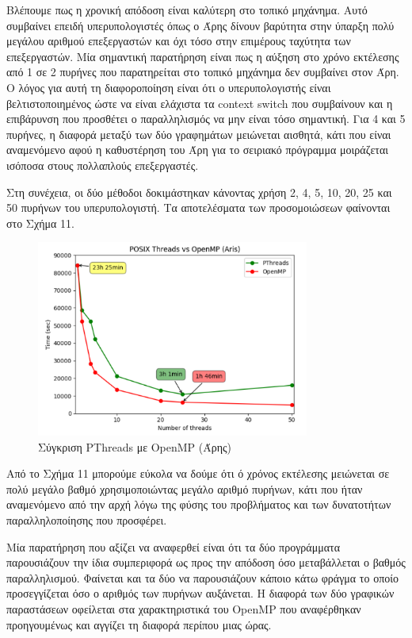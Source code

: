 \documentclass[12pt,a4paper]{article}
\begin{document}
Βλέπουμε πως η χρονική απόδοση είναι καλύτερη στο τοπικό μηχάνημα. Αυτό συμβαίνει επειδή υπερυπολογιστές όπως ο Άρης δίνουν βαρύτητα στην ύπαρξη πολύ μεγάλου αριθμού επεξεργαστών και όχι τόσο στην επιμέρους ταχύτητα των επεξεργαστών. Μία σημαντική παρατήρηση είναι πως η αύξηση στο χρόνο εκτέλεσης από 1 σε 2 πυρήνες που παρατηρείται στο τοπικό μηχάνημα δεν συμβαίνει στον Άρη. Ο λόγος για αυτή τη διαφοροποίηση είναι ότι ο υπερυπολογιστής είναι βελτιστοποιημένος ώστε να είναι ελάχιστα τα context switch που συμβαίνουν και η επιβάρυνση που προσθέτει ο παραλληλισμός να μην είναι τόσο σημαντική. Για 4 και 5 πυρήνες, η διαφορά μεταξύ των δύο γραφημάτων μειώνεται αισθητά, κάτι που είναι αναμενόμενο αφού η καθυστέρηση του Άρη για το σειριακό πρόγραμμα μοιράζεται ισόποσα στους πολλαπλούς επεξεργαστές.

Στη συνέχεια, οι δύο μέθοδοι δοκιμάστηκαν κάνοντας χρήση 2, 4, 5, 10, 20, 25 και 50 πυρήνων του υπερυπολογιστή. Τα αποτελέσματα των προσομοιώσεων φαίνονται στο Σχήμα 11.

\begin{figure}[h!]
\centering
\includegraphics[width=0.8\textwidth]{Figures/arisposvsomp.png}
\caption{Σύγκριση PThreads με OpenMP (Άρης)}
\end{figure}

Από το Σχήμα 11 μπορούμε εύκολα να δούμε ότι ό χρόνος εκτέλεσης μειώνεται σε πολύ μεγάλο βαθμό χρησιμοποιώντας μεγάλο αριθμό πυρήνων, κάτι που ήταν αναμενόμενο από την αρχή λόγω της φύσης του προβλήματος και των δυνατοτήτων παραλληλοποίησης που προσφέρει.

Μία παρατήρηση που αξίζει να αναφερθεί είναι ότι τα δύο προγράμματα παρουσιάζουν την ίδια συμπεριφορά ως προς την απόδοση όσο μεταβάλλεται ο βαθμός παραλληλισμού. Φαίνεται και τα δύο να παρουσιάζουν κάποιο κάτω φράγμα το οποίο προσεγγίζεται όσο ο αριθμός των πυρήνων αυξάνεται. Η διαφορά των δύο γραφικών παραστάσεων οφείλεται στα χαρακτηριστικά του OpenMP που αναφέρθηκαν προηγουμένως και αγγίζει τη διαφορά περίπου μιας ώρας.
\end{document}
